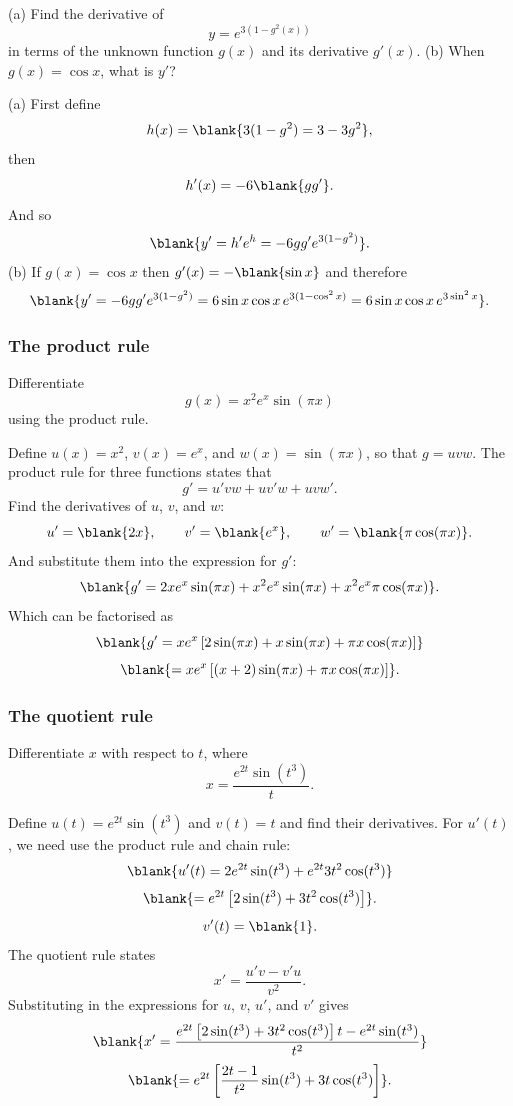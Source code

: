 \begin{example}[Video]
(a) Find the derivative of
\[
y=e^{3(1-g^2(x))}
\]
in terms of the unknown function $g(x)$ and its derivative $g'(x)$.
(b) When $g(x)=\cos x$, what is $y'$?
\end{example}
\begin{solution}
(a) First define
\[
h(x)=\blank{3(1-g^2)=3-3g^2},
\]
then
\[
h'(x)=-6\blank{gg'}.
\]
And so
\[
\blank{y'=h'e^h=-6gg'e^{3(1-g^2)}}.
\]
(b) If $g(x)=\cos x$ then $g'(x)=-\blank{\sin x}$ and therefore
\[
\blank{y'=-6gg'e^{3(1-g^2)}=6\sin x\cos x\,e^{3(1-\cos^2x)}=6\sin x\cos x\,e^{3\sin^2x}}.
\]
\end{solution}

\subsubsection{The product rule}
\begin{example}[Video]
Differentiate
\[
g(x)=x^2e^x\sin(\pi x)
\]
using the product rule.
\end{example}
\begin{solution}
Define $u(x)=x^2$, $v(x)=e^x$, and $w(x)=\sin(\pi x)$, so that $g=uvw$.
The product rule for three functions states that
\[
g'=u'vw+uv'w+uvw'.
\]
Find the derivatives of $u$, $v$, and $w$:
\[
u'=\blank{2x},\qquad v'=\blank{e^x},\qquad w'=\blank{\pi\cos(\pi x)}.
\]
And substitute them into the expression for $g'$:
\[
\blank{g'=2xe^x\sin(\pi x)+x^2e^x\sin(\pi x)+x^2e^x\pi\cos(\pi x)}.
\]
Which can be factorised as
\[
\blank{g'=xe^x\left[2\sin(\pi x)+x\sin(\pi x)+\pi x\cos(\pi x)\right]}
\]
\[
\blank{=xe^x\left[(x+2)\sin(\pi x)+\pi x\cos(\pi x)\right]}.
\]
\end{solution}

\subsubsection{The quotient rule}
\begin{example}[Video]
Differentiate $x$ with respect to $t$, where
\[
x=\frac{e^{2t}\sin(t^3)}{t}.
\]
\end{example}
\begin{solution}
Define $u(t)=e^{2t}\sin(t^3)$ and $v(t)=t$ and find their derivatives.
For $u'(t)$, we need use the product rule and chain rule:
\[
\blank{u'(t)=2e^{2t}\sin(t^3)+e^{2t}3t^2\cos(t^3)}
\]
\[
\blank{=e^{2t}\left[2\sin(t^3)+3t^2\cos(t^3)\right]}.
\]
\[
v'(t)=\blank{1}.
\]
The quotient rule states
\[
x'=\frac{u'v-v'u}{v^2}.
\]
Substituting in the expressions for $u$, $v$, $u'$, and $v'$ gives
\[
\blank{x'=\frac{e^{2t}\left[2\sin(t^3)+3t^2\cos(t^3)\right]t-e^{2t}\sin(t^3)}{t^2}}
\]
\[
\blank{=e^{2t}\left[\frac{2t-1}{t^2}\sin(t^3)+3t\cos(t^3)\right]}.
\]
\end{solution}

